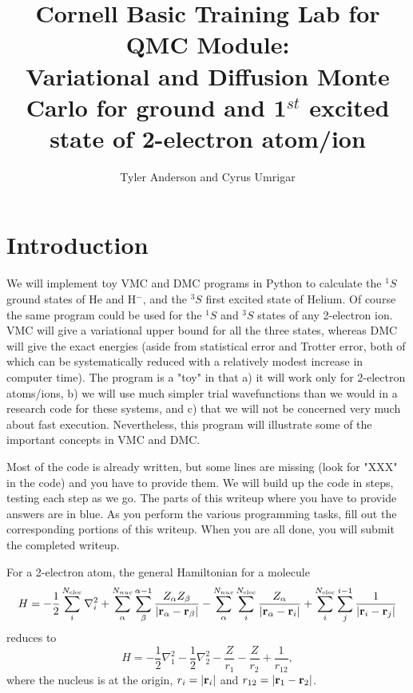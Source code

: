 \documentclass[11pt,aps,prb,amsmath,amssymb,superscriptaddress,notitlepage]{revtex4-1}
\def\beq{\begin{eqnarray}}
\def\eeq{\end{eqnarray}}
\def\rvec{{\bf r}}
\begin{document}
\title{Cornell Basic Training Lab for QMC Module:\\
Variational and Diffusion Monte Carlo for ground and 1$^{st}$ excited state of 2-electron atom/ion}

\author{Tyler Anderson and Cyrus Umrigar}

\maketitle

\section{Introduction}

We will implement toy VMC and DMC programs in Python to calculate the $^1S$ ground states of
He and H$^-$, and the $^3S$ first excited state of Helium.
Of course the same program could be used for the $^1S$ and $^3S$ states of any 2-electron ion.
VMC will give a variational upper bound for all the three states, whereas DMC will give the exact energies
(aside from statistical error and Trotter error, both of which can be systematically reduced
with a relatively modest increase in computer time).
The program is a "toy" in that a) it will work only for 2-electron atoms/ions,
b) we will use much simpler trial wavefunctions than we would in a research code for these systems,
and c) that we will not be concerned very much about fast execution.
Nevertheless, this program will illustrate some of the important concepts in VMC and DMC.

Most of the code is already written, but some lines are missing (look for "XXX" in the code) and you
have to provide them.
We will build up the code in steps, testing each step as we go.
The parts of this writeup where you have to provide answers are in {\color{blue} blue}.
As you perform the various programming tasks, fill out the corresponding portions of this writeup.
When you are all done, you will submit the completed writeup.

For a 2-electron atom, the general Hamiltonian for a molecule
\beq
H=-{1 \over 2}\sum_i^{N_{\rm elec}} \nabla_{i}^{2}
  + \sum_\alpha^{N_{nuc}} \sum_\beta^{\alpha-1} {Z_\alpha Z_\beta \over |\rvec_\alpha -\rvec_\beta|}
  -\sum_\alpha^{N_{nuc}} \sum_i^{N_{\rm elec}} {Z_\alpha \over |\rvec_\alpha - \rvec_i|}
  +\sum_i^{N_{\rm elec}} \sum_j^{i - 1} {1 \over |\rvec_i - \rvec_j|}
\eeq
reduces to
\[
H=-\frac{1}{2}\nabla_{1}^{2}-\frac{1}{2}\nabla_{2}^{2}-\frac{Z}{r_{1}}-\frac{Z}{r_{2}}+\frac{1}{r_{12}},
\]
where the nucleus is at the origin, $r_{i}=\left|\rvec_{i}\right|$ and $r_{12}=\left|\rvec_{1}-\rvec_{2}\right|$.
\end{document}
